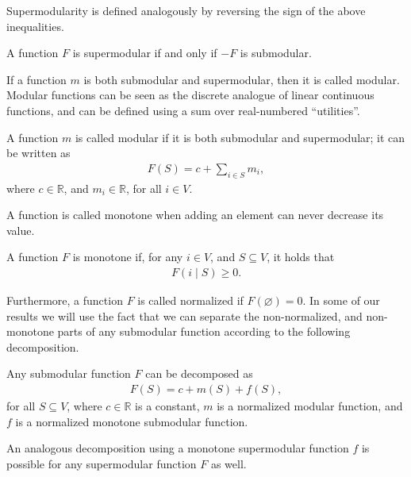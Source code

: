Supermodularity is defined analogously by reversing the sign of the above inequalities.
\begin{definition}[Supermodularity] \label{def:supermod}
A function $F$ is supermodular if and only if $-F$ is submodular.
\end{definition}

If a function $m$ is both submodular and supermodular, then it is called modular.
Modular functions can be seen as the discrete analogue of linear continuous functions, and can be defined using a sum over real-numbered ``utilities''.
\begin{definition}[Modularity]
A function $m$ is called modular if it is both submodular and supermodular; it can be written as
\begin{align*}
F(S) = c + \sum_{i \in S} m_i,
\end{align*}
where $c \in \mathbb{R}$, and $m_i \in \mathbb{R}$, for all $i \in V$.
\end{definition}

A function is called monotone when adding an element can never decrease its value.
\begin{definition}[Monotonicity]
A function $F$ is monotone if, for any $i \in V$, and $S \subseteq V$, it holds that
\begin{align*}
F(i \mid S) \geq 0.
\end{align*}
\end{definition}
Furthermore, a function $F$ is called normalized if $F(\varnothing) = 0$.
In some of our results we will use the fact that we can separate the non-normalized, and non-monotone parts of any submodular function according to the following decomposition.
\begin{definition} \label{def:decomp}
Any submodular function $F$ can be decomposed as
\begin{align} \label{eq:decomp}
  F(S) = c + m(S) + f(S),
\end{align}
for all $S \subseteq V$, where $c \in \mathbb{R}$ is a constant, $m$ is a normalized modular function, and $f$ is a normalized monotone submodular function.
\end{definition}
An analogous decomposition using a monotone supermodular function $f$ is possible for any supermodular function $F$ as well.

